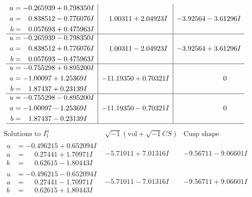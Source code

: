 \documentclass[1p]{elsarticle_modified}
\theoremstyle{definition}
\newcommand{\I}{\sqrt{-1}}
\begin{document}
$$\begin{array}{c|c|c}
\begin{aligned}
u &= -0.265939 + 0.798350 I \\
a &= \phantom{-}0.838512 - 0.776076 I \\
b &= \phantom{-}0.057693 + 0.475963 I\end{aligned}
 & \phantom{-}1.00311 + 2.04923 I & -3.92564 - 3.61296 I \\ \hline\begin{aligned}
u &= -0.265939 - 0.798350 I \\
a &= \phantom{-}0.838512 + 0.776076 I \\
b &= \phantom{-}0.057693 - 0.475963 I\end{aligned}
 & \phantom{-}1.00311 - 2.04923 I & -3.92564 + 3.61296 I \\ \hline\begin{aligned}
u &= -0.755298 + 0.895200 I \\
a &= -1.00097 + 1.25369 I \\
b &= \phantom{-}1.87437 + 0.23139 I\end{aligned}
 & -11.19350 + 0.70321 I & \phantom{-0.000000 } 0 \\ \hline\begin{aligned}
u &= -0.755298 - 0.895200 I \\
a &= -1.00097 - 1.25369 I \\
b &= \phantom{-}1.87437 - 0.23139 I\end{aligned}
 & -11.19350 - 0.70321 I & \phantom{-0.000000 } 0\\
 \hline 
 \end{array}$$\newpage$$\begin{array}{c|c|c}  
\text{Solutions to }I^u_{1}& \I (\text{vol} + \sqrt{-1}CS) & \text{Cusp shape}\\
 \hline 
\begin{aligned}
u &= -0.496215 + 0.652094 I \\
a &= \phantom{-}0.27441 + 1.70971 I \\
b &= \phantom{-}0.62615 - 1.80443 I\end{aligned}
 & -5.71011 + 7.01316 I & -9.56711 - 9.06601 I \\ \hline\begin{aligned}
u &= -0.496215 - 0.652094 I \\
a &= \phantom{-}0.27441 - 1.70971 I \\
b &= \phantom{-}0.62615 + 1.80443 I\end{aligned}
 & -5.71011 - 7.01316 I & -9.56711 + 9.06601 I \\ \hline\begin{aligned}

\end{aligned}
\end{array}$$
\end{document}

